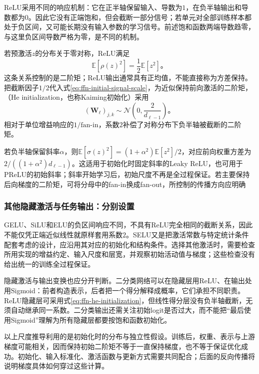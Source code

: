 ReLU采用不同的响应机制：它在正半轴保留输入、导数为$1$，在负半轴输出和导数都为$0$。因此它没有正端饱和，但会截断一部分信号；若单元对全部训练样本都处于负区间，又可能长期没有输入参数的学习信号。前述饱和函数两端导数趋零，与这里负区间导数严格为零，是不同的机制。

若预激活$z$的分布关于零对称，ReLU满足
\[
  \mathbb{E}[\rho(z)^2]=\frac12\mathbb{E}[z^2]\text{。}
\]
这条关系控制的是二阶矩；ReLU输出通常具有正均值，不能直接称为方差保持。把截断因子$1/2$代入式\eqref{eq:ffn-initial-signal-scale}，为近似保持前向激活的二阶矩，（He initialization，也称Kaiming初始化）采用
\begin{equation}
  (\bm{W}_\ell)_{j,k}\sim
  \mathcal{N}\!\left(0,\frac{2}{d_{\ell-1}}\right)\text{。}
  \label{eq:ffn-he-initialization}
\end{equation}
相对于单位增益响应的$1/\mathrm{fan\text{-}in}$，系数$2$补偿了对称分布下负半轴被截断的二阶矩。

若负半轴保留斜率$\alpha$，则$\mathbb{E}[\sigma(z)^2]=(1+\alpha^2)\mathbb{E}[z^2]/2$，对应前向权重方差为$2/((1+\alpha^2)d_{\ell-1})$。这适用于初始化时固定斜率的Leaky ReLU，也可用于PReLU的初始斜率；斜率开始学习后，初始尺度不再是全过程保证。若主要保持后向梯度的二阶矩，可将分母中的fan-in换成fan-out，所控制的传播方向应明确

\subsubsection{其他隐藏激活与任务输出：分别设置}
\label{sec:ffn-initialization-other}

GELU、SiLU和ELU的负区间响应不同，不具有ReLU完全相同的截断关系，因此不能仅凭正端近似线性就原样套用系数$2$。SELU又是把激活常数与特定统计条件配套考虑的设计，应沿用其对应的初始化和结构条件。选择其他激活时，需要检查所用实现的增益约定、输入尺度和层宽，并观察初始活动值与梯度；这些检查没有给出统一的训练全过程保证。

隐藏激活与输出变换也应分开判断。二分类网络可以在隐藏层用ReLU、在输出处用Sigmoid：前者构造表示，后者把一个得分解释成概率，它们承担不同职责。ReLU隐藏层可采用式\eqref{eq:ffn-he-initialization}，但线性得分层没有负半轴截断，无须自动继承同一系数。二分类输出还需关注初始logit是否过大，而不能把“最后使用Sigmoid”理解为所有隐藏层都要按饱和函数初始化。

以上尺度推导利用的是初始化时的分布与独立性假设。训练后，权重、表示与上游梯度可能相关，因而保持初始二阶矩不等于一直保持梯度，也不等于保证优化成功。初始化、输入标准化、激活函数与更新方式需要共同配合；后面的反向传播将说明梯度具体如何穿过这些计算。

